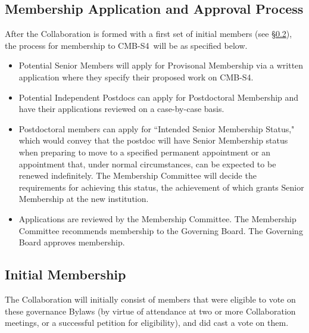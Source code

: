 \documentclass[12pt]{article}
\newcommand\collabname{CMB-S4}
\begin{document}
\subsection{Membership Application and Approval Process}
After the Collaboration is formed with a first set of initial members (see \S\ref{sec:initmembership}), the process for membership to \collabname\ will be as specified below.

\begin{itemize}

\item Potential Senior Members will apply for Provisonal Membership via a written application where they specify their proposed work on \collabname.

\item %
Potential Independent Postdocs can apply for Postdoctoral Membership and have their applications reviewed on a case-by-case basis.
  
\item Postdoctoral members can apply for ``Intended Senior Membership Status," which would convey that the postdoc will have Senior Membership status when preparing to move to a specified permanent appointment or an appointment that, under normal circumstances, can be expected to be renewed indefinitely.  The Membership Committee will decide the requirements for achieving this status, the achievement of which grants Senior Membership at the new institution.

\item Applications are reviewed by the Membership Committee. The Membership Committee recommends membership to the Governing Board.  The Governing Board approves membership.

\end{itemize}

\subsection{Initial Membership}
\label{sec:initmembership}
The Collaboration will initially consist of members that were eligible to vote on these governance Bylaws (by virtue of attendance at two or more Collaboration meetings, or a successful petition for eligibility), and did cast a vote on them. 

%
%
\end{document}
